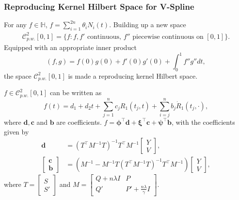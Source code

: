 \documentclass{beamer}
\begin{document}
\begin{frame}
\frametitle{Reproducing Kernel Hilbert Space for V-Spline}

For any $f \in \mathbb{H}$, $f=\sum_{i=1}^{2n} \theta_i N_i(t).$ Building up a new space \begin{align*}
\mathcal{C}_{p.w.}^{2}[0,1]=\{f:f,f' \mbox{ continuous, } f'' \mbox{ piecewise continuous on } [0,1] \}.
\end{align*} 
Equipped with an appropriate inner product
\begin{equation}
(f,g)=f(0) g(0)+f'(0) g'(0)+\int_{0}^{1}f''g''dt,
\end{equation}
the space $\mathcal{C}_{p.w.}^{2}[0,1]$ is made a reproducing kernel Hilbert space.
\end{frame}


\begin{frame}
$f \in \mathcal{C}_{p.w.}^2[0,1]$ can be written as
\begin{equation}\label{etaeq}
f(t)=d_1+d_2t+\sum_{j=1}^{n}c_jR_1(t_j,t)+\sum_{i=j}^{n}b_j\dot{R}_1(t_j,\cdot),
\end{equation}
where $\mathbf{d},\mathbf{c}$ and $\mathbf{b}$ are coefficients. 
 $f= \mathbf{\phi}^\top \mathbf{d}+\mathbf{\xi}^\top \mathbf{c}+\mathbf{\psi}^\top \mathbf{b}$, with the coefficients given by
\begin{align*}
\mathbf{d}&=(T^\top M^{-1}T)^{-1}T^\top M^{-1}\begin{bmatrix}Y\\V \end{bmatrix},\\
\begin{bmatrix}\mathbf{c}\\\mathbf{b}\end{bmatrix} &=
(M^{-1}-M^{-1}T(T^\top M^{-1} T)^{-1}T^\top M^{-1})\begin{bmatrix}Y\\V \end{bmatrix},
\end{align*} where $T=\begin{bmatrix} S\\S' \end{bmatrix}$ and $M=\begin{bmatrix}
Q+n\lambda I& P\\
Q'& P'+\frac{n\lambda}{\gamma}I
\end{bmatrix}$.
\end{frame}
\end{document}
